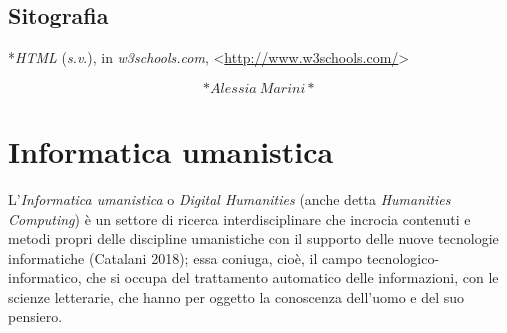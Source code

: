 \documentclass[
  b5paper,
  twoside,
  12pt,
  chapterprefix=false,
  bibliography=totocnumbered,
  parskip=false]{scrbook}
\begin{document}
\hypertarget{sitografia-17}{%
\section*{Sitografia}\label{sitografia-17}}

*\emph{HTML} (\emph{s.v}.), in \emph{w3schools.com},
\textless{}\href{http://www.w3schools.com/}{{http://www.w3schools.com/}}\textgreater{}

\[*Alessia~Marini*\]

\hypertarget{informatica-umanistica}{%
\chapter{Informatica umanistica}\label{informatica-umanistica}}

L'\emph{Informatica umanistica} o \emph{Digital Humanities} (anche detta
\emph{Humanities Computing}) è un settore di ricerca interdisciplinare che
incrocia contenuti e metodi propri delle discipline umanistiche con il
supporto delle nuove tecnologie informatiche (Catalani 2018); essa
coniuga, cioè, il campo tecnologico-informatico, che si occupa del
trattamento automatico delle informazioni, con le scienze letterarie,
che hanno per oggetto la conoscenza dell'uomo e del suo pensiero.
\end{document}
